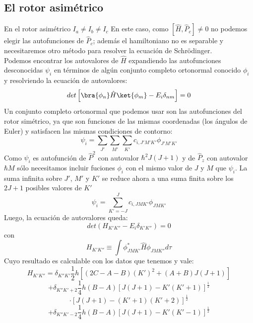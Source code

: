 \documentclass[a4paper]{article}
\begin{document}
\subsection{El rotor asimétrico}
En el rotor asimétrico $I_a\neq I_b\neq I_c$
En este caso, como $\left[\hat H,\hat P_c\right]\neq 0$ no podemos elegir las autofunciones de $\hat P_c$; además el hamiltoniano no es separable y necesitaremos otro método para resolver la ecuación de Schrödinger.\\
Podemos  encontrar los autovalores de $\hat H$ expandiendo las autofunciones desconocidas $\psi_i$ en términos de algún conjunto completo ortonormal conocido $\phi_i$ y resolviendo la ecuación de autovalores:
\begin{equation}
det \left[ \bra{\phi_n}\hat H\ket{\phi_m} - E_i\delta_{nm} \right]=0
\end{equation}
Un conjunto completo ortonormal que podemos usar son las autofunciones del rotor simétrico, ya que son funciones de las mismas coordenadas (los ángulos de Euler) y satisfacen las mismas condiciones de contorno:
\begin{equation}
\psi_i = \sum_{J'}\sum_{M'}\sum_{K'}c_{i,J'M'K'}\phi_{J'M'K'}
\end{equation}
Como $\psi_i$ es autofunción de $\hat P^2$ con autovalor $\hbar^2J(J+1)$ y de $\hat P_z$ con autovalor $\hbar M$ sólo necesitamos incluir fuciones $\phi_i$ con el mismo valor de $J$ y $M$ que $\psi_i$. La suma infinita sobre $J'$, $M'$ y $K'$ se reduce ahora a una suma finita sobre los $2J+1$ posibles valores de $K'$
\begin{equation}
\psi_i = \sum_{K'=-J}^Jc_{i,JMK'}\phi_{JMK'}
\end{equation}
Luego, la ecuación de autovalores queda:
\begin{equation}
det\left(H_{K'K''}-E_i\delta_{K'K''}\right)=0
\end{equation}
con
\begin{equation}
H_{K'K''}\equiv\int\phi^*_{JMK'}\hat H\phi_{JMK''}d\tau
\end{equation}
Cuyo resultado es calculable con los datos que tenemos y vale:
$$
H_{K'K''}=\delta_{K''K'}\frac{1}{2}h\left[\left(2C-A-B\right)\left(K'\right)^2+\left(A+B\right)J\left(J+1\right)\right]$$$$+\delta_{K''K'+2}\frac{1}{4}h\left(B-A\right)\left[J\left(J+1\right)-K'\left(K'+1\right)\right]^\frac{1}{2}$$$$\cdot\left[J\left(J+1\right)-\left(K'+1\right)\left(K'+2\right)\right]^\frac{1}{2}$$$$+\delta_{K''K'-2}\frac{1}{4}h\left(B-A\right)\left[J\left(J+1\right)-K'\left(K'-1\right)\right]^\frac{1}{2}$$
\end{document}
